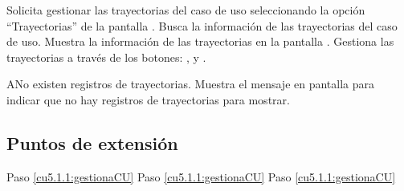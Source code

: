  \begin{UCtrayectoria}
    \UCpaso[\UCactor] Solicita gestionar las trayectorias del caso de uso seleccionando la opción ``Trayectorias'' de la pantalla .
    \UCpaso[\UCsist] Busca la información de las trayectorias del caso de uso. 
    \UCpaso[\UCsist] Muestra la información de las trayectorias en la pantalla . 
    \UCpaso[\UCactor] Gestiona las trayectorias a través de los botones: , \btnEditar y \btnEliminar. \label{cu5.1.1:gestionaCU}
 \end{UCtrayectoria}
 
 \begin{UCtrayectoriaA}{A}{No existen registros de trayectorias.}
    \UCpaso[\UCsist] Muestra el mensaje  en pantalla  
    para indicar que no hay registros de trayectorias para mostrar.
 \end{UCtrayectoriaA}
 

\subsection{Puntos de extensión}

	{Paso \ref{cu5.1.1:gestionaCU}}
	{}
	{Paso \ref{cu5.1.1:gestionaCU}}
	{}
	{Paso \ref{cu5.1.1:gestionaCU}}
	{}
  